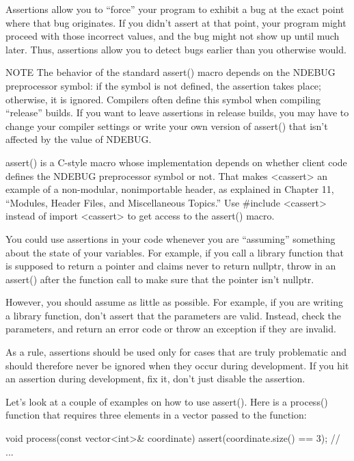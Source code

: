 Assertions allow you to “force” your program to exhibit a bug at the exact point where that bug originates. If you didn’t assert at that point, your program might proceed with those incorrect values, and the bug might not show up until much later. Thus, assertions allow you to detect bugs earlier than you otherwise would.

\begin{myNotic}{NOTE}
The behavior of the standard assert() macro depends on the NDEBUG preprocessor symbol: if the symbol is not defined, the assertion takes place; otherwise, it is ignored. Compilers often define this symbol when compiling “release” builds. If you want to leave assertions in release builds, you may have to change your compiler settings or write your own version of assert() that isn’t affected by the value of NDEBUG.
\end{myNotic}

assert() is a C-style macro whose implementation depends on whether client code defines the NDEBUG preprocessor symbol or not. That makes <cassert> an example of a non-modular, nonimportable header, as explained in Chapter 11, “Modules, Header Files, and Miscellaneous Topics.” Use \#include <cassert> instead of import <cassert> to get access to the assert() macro.

You could use assertions in your code whenever you are “assuming” something about the state of your variables. For example, if you call a library function that is supposed to return a pointer and claims never to return nullptr, throw in an assert() after the function call to make sure that the pointer isn’t nullptr.

However, you should assume as little as possible. For example, if you are writing a library function, don’t assert that the parameters are valid. Instead, check the parameters, and return an error code or throw an exception if they are invalid.

As a rule, assertions should be used only for cases that are truly problematic and should therefore never be ignored when they occur during development. If you hit an assertion during development, fix it, don’t just disable the assertion.

Let’s look at a couple of examples on how to use assert(). Here is a process() function that requires three elements in a vector passed to the function:

\begin{cpp}
void process(const vector<int>& coordinate)
{
    assert(coordinate.size() == 3);
    // ...
}
\end{cpp}

